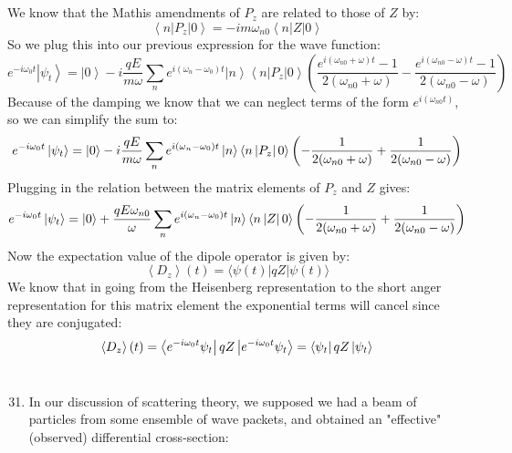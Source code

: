 \documentclass[12pt]{article}
\begin{document}
\subsection{}
We know that the Mathis amendments of $P_z$ are related to those of $Z$ by:
\begin{equation}
\left\langle n\left|P_{z}\right|0\right\rangle = -i m \omega_{n 0} \left\langle n\left|Z\right|0\right\rangle
\end{equation}
So we plug this into our previous expression for the wave function:
\begin{equation}
e^{-i\omega_0 t}\left|\psi_t \right\rangle = \left|0\right\rangle -i \frac{q E}{m \omega} \sum_{n} e^{i(\omega_n - \omega_0) t} \left|n\right\rangle \left\langle n\left|P_z\right|0\right\rangle \left( \frac{e^{i (\omega _{n0} + \omega) t} - 1}{2 (\omega _{n0} + \omega)} - \frac{e^{i (\omega _{n0} - \omega) t} - 1}{2 (\omega _{n0} - \omega)} \right)
\end{equation}
Because of the damping we know that we can neglect terms of the form $e^{i(\omega_{n0} t)}$, so we can simplify the sum to:
\begin{equation}
  e^{-i\omega_0 t}\ket{\psi _{t}} = \ket{0} -i \frac{q E}{m \omega} \sum_{n} e^{i(\omega_n - \omega_0) t} \ket{n} \left\langle n\left|P_z\right|0\right\rangle \left( -\frac{1}{2 (\omega _{n0} + \omega)} + \frac{1 }{2 (\omega _{n0} - \omega)} \right) 
\end{equation}
Plugging in the relation between the matrix elements of $P_z$ and $Z$ gives:
\begin{equation}
  e^{-i\omega_0 t}\ket{\psi _{t}} = \ket{0} + \frac{qE\omega_{n0}}{\omega} \sum_{n} e^{i(\omega_{n} - \omega_0) t} \ket{n} \left\langle n\left|Z\right|0\right\rangle \left( -\frac{1}{2 (\omega _{n0} + \omega)} + \frac{1 }{2 (\omega _{n0} - \omega)} \right)
\end{equation} 
Now the expectation value of the dipole operator is given by:
\begin{equation}
\left\langle D_{z}\right\rangle(t)=\langle\psi(t)|q Z| \psi(t)\rangle
\end{equation}
We know that in going from the Heisenberg representation to the short anger representation for this matrix element the exponential terms will cancel since they are conjugated:
\begin{equation}
\left\langle D_{z}\right\rangle(t)=\bra{e^{-i\omega_0 t}\psi_t}q Z \ket{e^{-i\omega_0 t}\psi_t} = \bra{\psi_t}q Z\ket{\psi_t}
\end{equation}
\section{}
\begin{enumerate}
  \setcounter{enumi}{30}
  \item In our discussion of scattering theory, we supposed we had a beam of particles from some ensemble of wave packets, and obtained an "effective" (observed) differential cross-section:
\end{enumerate}
\end{document}
